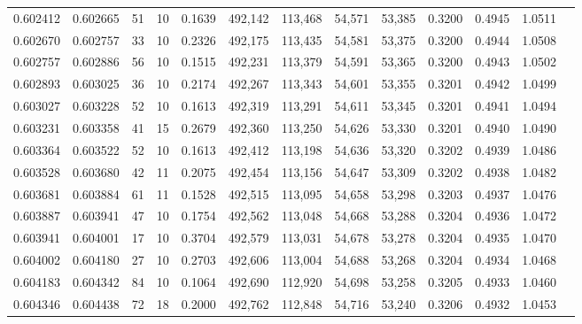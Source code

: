 \begin{tabular}{rrrrrrrrrrrrr}
0.602412 & 0.602665 &    51 &  10 &                                     0.1639 & 492,142 & 113,468 &  54,571 &  53,385 & 0.3200 & 0.4945 & 1.0511 \\
0.602670 & 0.602757 &    33 &  10 &                                     0.2326 & 492,175 & 113,435 &  54,581 &  53,375 & 0.3200 & 0.4944 & 1.0508 \\
0.602757 & 0.602886 &    56 &  10 &                                     0.1515 & 492,231 & 113,379 &  54,591 &  53,365 & 0.3200 & 0.4943 & 1.0502 \\
0.602893 & 0.603025 &    36 &  10 &                                     0.2174 & 492,267 & 113,343 &  54,601 &  53,355 & 0.3201 & 0.4942 & 1.0499 \\
0.603027 & 0.603228 &    52 &  10 &                                     0.1613 & 492,319 & 113,291 &  54,611 &  53,345 & 0.3201 & 0.4941 & 1.0494 \\
0.603231 & 0.603358 &    41 &  15 &                                     0.2679 & 492,360 & 113,250 &  54,626 &  53,330 & 0.3201 & 0.4940 & 1.0490 \\
0.603364 & 0.603522 &    52 &  10 &                                     0.1613 & 492,412 & 113,198 &  54,636 &  53,320 & 0.3202 & 0.4939 & 1.0486 \\
0.603528 & 0.603680 &    42 &  11 &                                     0.2075 & 492,454 & 113,156 &  54,647 &  53,309 & 0.3202 & 0.4938 & 1.0482 \\
0.603681 & 0.603884 &    61 &  11 &                                     0.1528 & 492,515 & 113,095 &  54,658 &  53,298 & 0.3203 & 0.4937 & 1.0476 \\
0.603887 & 0.603941 &    47 &  10 &                                     0.1754 & 492,562 & 113,048 &  54,668 &  53,288 & 0.3204 & 0.4936 & 1.0472 \\
0.603941 & 0.604001 &    17 &  10 &                                     0.3704 & 492,579 & 113,031 &  54,678 &  53,278 & 0.3204 & 0.4935 & 1.0470 \\
0.604002 & 0.604180 &    27 &  10 &                                     0.2703 & 492,606 & 113,004 &  54,688 &  53,268 & 0.3204 & 0.4934 & 1.0468 \\
0.604183 & 0.604342 &    84 &  10 &                                     0.1064 & 492,690 & 112,920 &  54,698 &  53,258 & 0.3205 & 0.4933 & 1.0460 \\
0.604346 & 0.604438 &    72 &  18 &                                     0.2000 & 492,762 & 112,848 &  54,716 &  53,240 & 0.3206 & 0.4932 & 1.0453 \\

\end{tabular}
